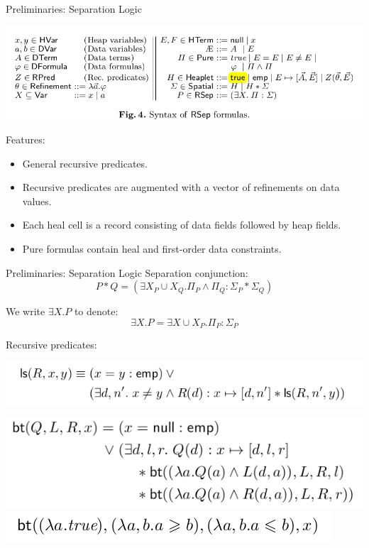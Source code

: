 \documentclass[aspectratio=1610, 13pt]{beamer}
\begin{document}
\begin{frame}{Preliminaries: Separation Logic}
\begin{center}
\includegraphics[scale=0.4]{10.png}
\end{center}
Features:
\begin{itemize}
\item General recursive predicates.
\item Recursive predicates are augmented with a vector of refinements on data values.
\item Each heal cell is a record consisting of data fields followed by heap fields.
\item Pure formulas contain heal and first-order data constraints.
\end{itemize}
\end{frame}

\begin{frame}{Preliminaries: Separation Logic}
Separation conjunction:
$$P \ast Q = (\exists X_P \cup X_Q. \Pi_P\wedge \Pi_Q : \Sigma_P \ast \Sigma_Q)$$

We write $\exists X. P$ to denote:
$$\exists X. P = \exists X\cup X_P. \Pi_P : \Sigma_P$$

Recursive predicates:
\begin{center}
\includegraphics[scale=0.4]{11.png}

\includegraphics[scale=0.4]{12.png}
\includegraphics[scale=0.4]{14.png}
\end{center}
\end{frame}
\end{document}

